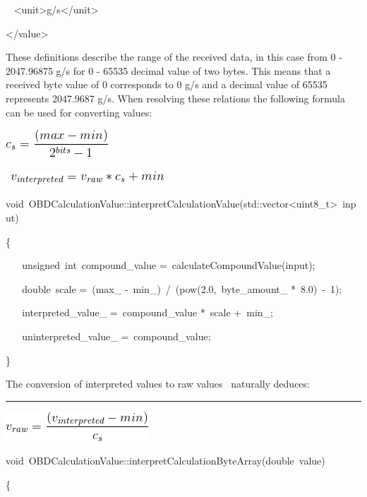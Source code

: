 {~ \textless{}unit\textgreater{}}{g/s}{\textless{}/unit\textgreater{}}

{\textless{}/value\textgreater{}}

{These definitions describe the range of the received data, in this case
from 0 - 2047.96875 g/s for 0 - 65535 decimal value of two bytes. This
means that a received byte value of 0 corresponds to 0 g/s and a decimal
value of 65535 represents 2047.9687 g/s. When resolving these relations
the following formula can be used for converting values: }

{\includegraphics{images/image08.png}}

{~}{\includegraphics{images/image00.png}}

{}

{void}{~}{OBDCalculationValue}{::}{interpretCalculationValue}{(}{std}{::}{vector}{\textless{}uint8\_t\textgreater{}}{~input)}

{\{}

{~ ~ }{unsigned}{~}{int}{~compound\_value
}{=}{~calculateCompoundValue}{(}{input}{);}

{~ ~ }{double}{~scale }{=}{~}{(}{max\_
}{-}{~min\_}{)}{~}{/}{~}{(}{pow}{(}{2.0}{,}{~byte\_amount\_
}{*}{~}{8.0}{)}{~}{-}{~}{1}{);}

{~ ~ interpreted\_value\_ }{=}{~compound\_value }{*}{~scale
}{+}{~min\_;}

{~ ~ uninterpreted\_value\_ }{=}{~compound\_value;}

{\}}

{The conversion of interpreted values to raw values ~naturally deduces:}

\begin{center}\rule{0.5\linewidth}{\linethickness}\end{center}

{}

{\includegraphics{images/image01.png}}

{void}{~}{OBDCalculationValue}{::}{interpretCalculationByteArray}{(}{double}{~value)}

{\{}

